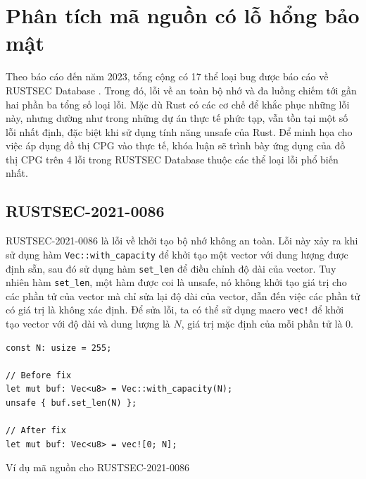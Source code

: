 \section{Phân tích mã nguồn có lỗ hổng bảo mật}

Theo báo cáo đến năm 2023, tổng cộng có 17 thể loại bug được báo cáo về RUSTSEC Database \cite{zheng2023closer}.
Trong đó, lỗi về an toàn bộ nhớ và đa luồng chiếm tới gần hai phần ba tổng số loại lỗi.
Mặc dù Rust có các cơ chế để khắc phục những lỗi này, nhưng dường như trong những dự án thực tế phức tạp, vẫn tồn tại một số lỗi nhất định, đặc biệt khi sử dụng tính năng unsafe của Rust.
Để minh họa cho việc áp dụng đồ thị CPG vào thực tế, khóa luận sẽ trình bày ứng dụng của đồ thị CPG trên 4 lỗi trong RUSTSEC Database thuộc các thể loại lỗi phổ biến nhất.

\subsection{RUSTSEC-2021-0086}

RUSTSEC-2021-0086 là lỗi về khởi tạo bộ nhớ không an toàn.
Lỗi này xảy ra khi sử dụng hàm \texttt{Vec::with\_capacity} để khởi tạo một vector với dung lượng được định sẵn, sau đó sử dụng hàm \texttt{set\_len} để điều chỉnh độ dài của vector.
Tuy nhiên hàm \texttt{set\_len}, một hàm được coi là unsafe, nó không khởi tạo giá trị cho các phần tử của vector mà chỉ sửa lại độ dài của vector, dẫn đến việc các phần tử có giá trị là không xác định.
Để sửa lỗi, ta có thể sử dụng macro \texttt{vec!} để khởi tạo vector với độ dài và dung lượng là $N$, giá trị mặc định của mỗi phần tử là $0$.

\begin{listing}[H]
\begin{verbatim}
const N: usize = 255;

// Before fix
let mut buf: Vec<u8> = Vec::with_capacity(N);
unsafe { buf.set_len(N) };

// After fix
let mut buf: Vec<u8> = vec![0; N];
\end{verbatim}
\caption{Ví dụ mã nguồn cho RUSTSEC-2021-0086}
\label{code:c5_RUSTSEC-2021-0086}
\end{listing}


